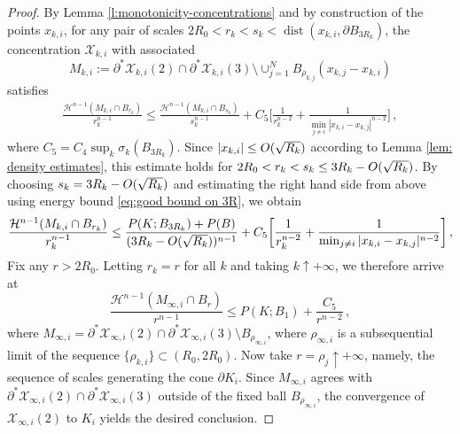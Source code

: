 \documentclass[10pt,a4paper]{amsart}
\DeclareMathOperator{\dist}{dist}
\newcommand{\X}{\mathcal{X}}
\begin{document}
\begin{proof}
By Lemma \ref{l:monotonicity-concentrations} and by construction of the points $x_{k,i}$, for any pair of scales $2R_0<r_k<s_k<\dist(x_{k,i},\partial B_{3R_k})$, the concentration $\X_{k,i}$ with associated
\[
    M_{k,i} := \partial^*\X_{k,i}(2) \cap \partial^* \X_{k,i}(3) \setminus \cup_{j=1}^N B_{\rho_{k,j}}(x_{k,j}-x_{k,i})
\]
satisfies
\begin{align*}
    \frac{\mathcal{H}^{n-1}({M_{k,i}} \cap B_{r_k})}{r_k^{n-1}} \leq \frac{\mathcal{H}^{n-1}({M_{k,i}} \cap B_{s_k})}{s_k^{n-1}} + C_5 \bigg[\frac{1}{r_k^{n-2}} + \frac{1}{\min_{j\neq i}|x_{k,i}-x_{k,j}|^{n-2}}\bigg]\,,
\end{align*}
where $C_5 = C_4\sup_k \sigma_{k}(B_{3R_k})$. Since $|x_{k,i}|\leq {\rm O}(\sqrt{R_k})$ according to Lemma \ref{lem: density estimates}, this estimate holds for $2R_0<r_k < s_k \leq 3R_k - {\rm O}(\sqrt{R_k})$.
By choosing $s_k = 3R_k - {\rm O}(\sqrt{R_k})$ and estimating the right hand side from above using energy bound \eqref{eq:good bound on 3R}, we obtain
\begin{align*}
    \frac{\mathcal{H}^{n-1}(M_{k,i} \cap B_{r_k})}{r_k^{n-1}} \leq \frac{P(K;B_{3R_k})+P(B)}{(3R_k-{\rm O}(\sqrt{R_k}))^{n-1}} + C_5 \bigg[\frac{1}{r_k^{n-2}} + \frac{1}{\min_{j\neq i}|x_{k,i}-x_{k,j}|^{n-2}}\bigg]\,,
\end{align*}
Fix any $r>2R_0$. {Letting $r_k=r$ for all $k$ and} taking $k \uparrow +\infty$, we therefore arrive at
\[
    \frac{\mathcal{H}^{n-1}(M_{\infty,i} \cap B_{r})}{r^{n-1}} \leq P( K ; B_1)  + \frac{C_5}{r^{n-2}}\,,
\]
where $M_{\infty, i} = \partial^* \X_{\infty,i}(2) \cap \partial^* \X_{\infty,i}(3) \setminus  B_{\rho_{\infty,i}}$, where $\rho_{\infty,i}$ is a subsequential limit of the sequence $\{\rho_{k,i}\} \subset (R_0,2R_0)$. Now take $r = \rho_j \uparrow +\infty$, namely, the sequence of scales generating the cone $\partial K_i$. Since $M_{\infty,i}$ agrees with $\partial^* \X_{\infty,i}(2) \cap \partial^* \X_{\infty,i}(3)$ outside of the fixed ball $B_{\rho_{\infty,i}}$, the convergence of $\X_{\infty,i}(2)$ to $K_i$ yields the desired conclusion.
\end{proof}
\end{document}
